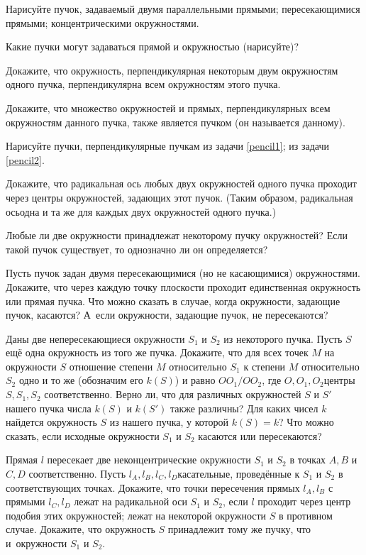 \documentclass[a4paper,12pt]{article}
\begin{document}
\label{pencil2}
Нарисуйте пучок, задаваемый двумя
 параллельными прямыми;
 пересекающимися прямыми;
 концентрическими окружностями.

Какие пучки могут задаваться прямой и окружностью (нарисуйте)?

Докажите, что окружность, перпендикулярная некоторым двум окружностям одного пучка, перпендикулярна всем окружностям этого пучка.

Докажите, что множество окружностей и прямых, перпендикулярных всем окружностям данного пучка, также является пучком (он называется  данному).

Нарисуйте пучки, перпендикулярные пучкам
 из задачи \ref{pencil1};
 из задачи \ref{pencil2}.

Докажите, что радикальная ось любых двух окружностей одного пучка проходит через центры окружностей, задающих этот пучок. (Таким образом, радикальная ось\т одна и та же для каждых двух окружностей одного пучка.)

Любые ли две окружности принадлежат некоторому пучку окружностей?
Если такой пучок существует, то однозначно ли он определяется?

\newpage

Пусть пучок задан двумя пересекающимися (но не касающимися) окружностями. Докажите, что через каждую точку плоскости проходит единственная окружность или прямая пучка.
Что можно сказать в случае, когда окружности, задающие пучок, касаются?
А~если окружности, задающие пучок, не пересекаются?

Даны две непересекающиеся окружности $S_1$ и $S_2$ из некоторого пучка. Пусть $S$\т ещё одна окружность из того же пучка. Докажите, что для всех точек $M$ на окружности $S$ отношение степени $M$ относительно $S_1$ к степени $M$ относительно $S_2$ одно и то же (обозначим его $k(S)$) и равно $OO_1/OO_2$, где $O,O_1,O_2$\т центры $S,S_1,S_2$ соответственно.
Верно ли, что для различных окружностей $S$ и $S'$ нашего пучка числа $k(S)$ и $k(S')$ также различны?
Для каких чисел $k$ найдется окружность $S$ из нашего пучка, у которой $k(S)=k$?
Что можно сказать, если исходные окружности $S_1$ и $S_2$ касаются или пересекаются?

Прямая $l$ пересекает две неконцентрические окружности $S_1$ и $S_2$ в точках $A,B$ и $C,D$ соответственно. Пусть $l_A,l_B,l_C,l_D$\т касательные, проведённые к $S_1$ и $S_2$ в соответствующих точках. Докажите, что точки пересечения прямых $l_A,l_B$ с прямыми $l_C,l_D$
лежат на радикальной оси $S_1$ и $S_2$, если $l$ проходит через центр подобия этих окружностей;
лежат на некоторой окружности $S$ в противном случае.
Докажите, что окружность $S$ принадлежит тому же пучку, что и~окружности $S_1$ и $S_2$.
\end{document}
